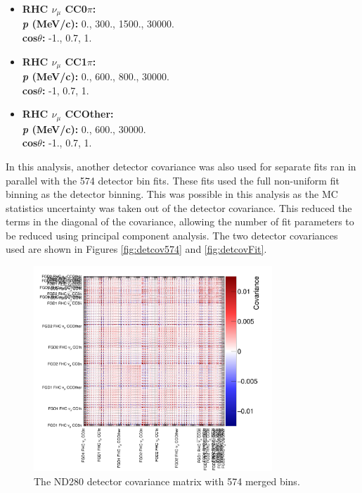 \begin{itemize}
\item \textbf{RHC $\nu_{\mu}$ CC0$\pi$:}\\
\textbf{\textit{p} (MeV/c):} 0., 300., 1500., 30000.\\
\textbf{cos$\theta$:} -1., 0.7, 1.

\item \textbf{RHC $\nu_{\mu}$ CC1$\pi$:}\\
\textbf{\textit{p} (MeV/c):} 0., 600., 800., 30000.\\
\textbf{cos$\theta$:} -1, 0.7, 1.

\item \textbf{RHC $\nu_{\mu}$ CCOther:}\\
\textbf{\textit{p} (MeV/c):} 0., 600., 30000.\\
\textbf{cos$\theta$:} -1., 0.7, 1.

\end{itemize}

In this analysis, another detector covariance was also used for separate fits ran in parallel with the 574 detector bin fits. These fits used the full non-uniform fit binning as the detector binning. This was possible in this analysis as the MC statistics uncertainty was taken out of the detector covariance. This reduced the terms in the diagonal of the covariance, allowing the number of fit parameters to be reduced using principal component analysis. The two detector covariances used are shown in Figures \ref{fig:detcov574} and \ref{fig:detcovFit}.

\begin{figure}[h]
\centering
\includegraphics*[width=0.8\textwidth,clip]{figs/detcov574}
\caption{The ND280 detector covariance matrix with 574 merged bins.}\label{fig:detcorr574}
\end{figure}


